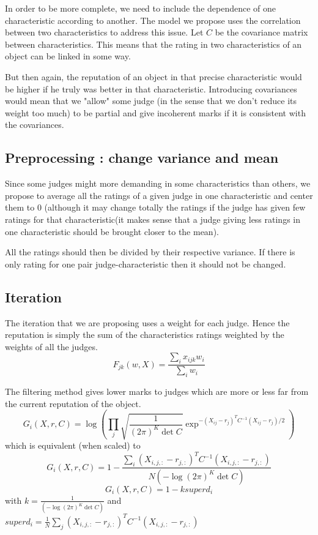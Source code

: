 \documentclass[12pt,a4paper,notitlepage]{article}
\begin{document}
In order to be more complete, we need to include the dependence of one characteristic according to another. The model we propose uses the correlation between two characteristics to address this issue.
Let $C$ be the covariance matrix between characteristics. This means that the rating in two characteristics of an object can be linked in some way.

But then again, the reputation of an object in that precise characteristic would be higher if he truly was better in that characteristic. Introducing covariances would mean that we "allow" some judge (in the sense that we don't reduce its weight too much) to be partial and give incoherent marks if it is consistent with the covariances.

\subsection{Preprocessing : change variance and mean}
Since some judges might more demanding in some characteristics than others, we propose to average all the ratings of a given judge in one characteristic and center them to $0$ (although it may change totally the ratings if the judge has given few ratings for that characteristic(it makes sense that a judge giving less ratings in one characteristic should be brought closer to the mean).

All the ratings should then be divided by their respective variance. If there is only rating for one pair judge-characteristic then it should not be changed.

\subsection{Iteration}
The iteration that we are proposing uses a weight for each judge. Hence the reputation is simply the sum of the characteristics ratings weighted by the weights of all the judges.
$$F_{jk}(w,X) = \frac{\sum_{i}x_{ijk}w_{i}}{\sum_i w_{i}}$$

The filtering method gives lower marks to judges which are more or less far from the current reputation of the object.
$$G_{i}(X,r,C) = \log (\prod_j \sqrt{\frac{1}{(2\pi)^{K}\det C}} \exp^{- (X_{ij}-r_j)^TC^{-1} (X_{ij}-r_j)/2})$$
which is equivalent (when scaled) to
$$G_{i}(X,r,C) = 1 - \frac{\sum_i (X_{i,j,:}-r_{j,:})^TC^{-1}(X_{i,j,:}-r_{j,:})}{N(-\log(2\pi )^K \det C)}$$
$$G_{i}(X,r,C) = 1 -k superd_i$$
with $k= \frac{1}{(-\log(2\pi )^K \det C)}$ and $superd_i =  \frac{1}{N}\sum_{j} (X_{i,j,:}-r_{j,:})^T C^{-1} (X_{i,j,:}-r_{j,:})$\\
\end{document}
